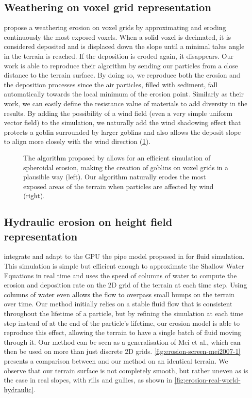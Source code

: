 \subsection{Weathering on voxel grid representation}

\cite{Jones2010} propose a weathering erosion on voxel grids by approximating and eroding continuously the most exposed voxels. When a solid voxel is decimated, it is considered deposited and is displaced down the slope until a minimal talus angle in the terrain is reached. If the deposition is eroded again, it disappears. Our work is able to reproduce their algorithm by sending our particles from a close distance to the terrain surface. By doing so, we reproduce both the erosion and the deposition processes since the air particles, filled with sediment, fall automatically towards the local minimum of the erosion point. Similarly as their work, we can easily define the resistance value of materials to add diversity in the results. By adding the possibility of a wind field (even a very simple uniform vector field) to the simulation, we naturally add the wind shadowing effect that protects a goblin surrounded by larger goblins and also allows the deposit slope to align more closely with the wind direction (\cref{fig:erosion-screen-jones2010}).

\begin{figure}[H]
    \caption{The algorithm proposed by \cite{Jones2010} allows for an efficient simulation of spheroidal erosion, making the creation of goblins on voxel grids in a plausible way (left). Our algorithm naturally erodes the most exposed areas of the terrain when particles are affected by wind (right).}
    \label{fig:erosion-screen-jones2010}
\end{figure}

\subsection{Hydraulic erosion on height field representation}

\cite{Mei2007} integrate and adapt to the GPU the pipe model proposed in \cite{OBrien1995} for fluid simulation. This simulation is simple but efficient enough to approximate the Shallow Water Equations in real time and uses the speed of columns of water to compute the erosion and deposition rate on the 2D grid of the terrain at each time step. Using columns of water even allows the flow to overpass small bumps on the terrain over time. Our method initially relies on a stable fluid flow that is consistent throughout the lifetime of a particle, but by refining the simulation at each time step instead of at the end of the particle's lifetime, our erosion model is able to reproduce this effect, allowing the terrain to have a single batch of fluid moving through it. Our method can be seen as a generalisation of Mei et al., which can then be used on more than just discrete 2D grids. \cref{fig:erosion-screen-mei2007-1} presents a comparison between \cite{Mei2007} and our method on an identical terrain. We observe that our terrain surface is not completely smooth, but rather uneven as is the case in real slopes, with rills and gullies, as shown in \cref{fig:erosion-real-world-hydraulic}.

